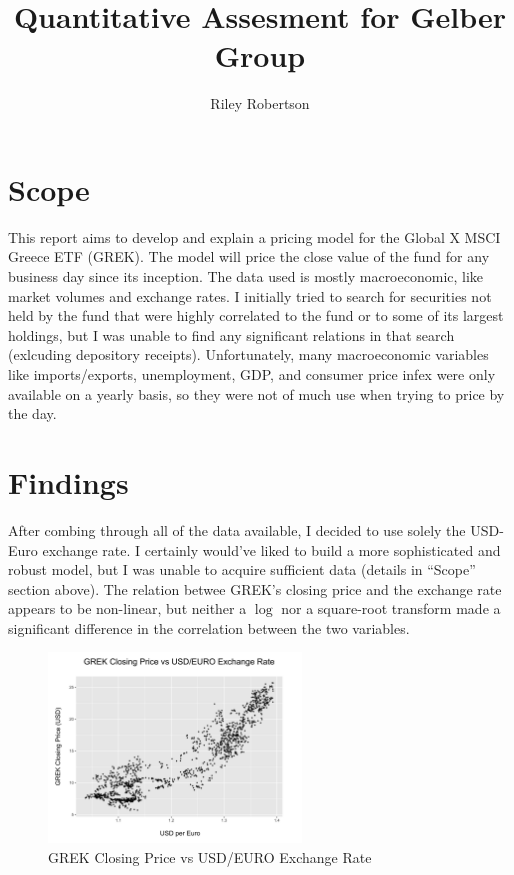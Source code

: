 \documentclass{article}\usepackage[]{graphicx}\usepackage[]{color}
\begin{document}
\title{Quantitative Assesment for Gelber Group}
\author{Riley Robertson}
\maketitle

\section{Scope}
This report aims to develop and explain a pricing model for the Global X MSCI Greece ETF (GREK). The model will price the close value of the fund for any business day since its inception. The data used is mostly macroeconomic, like market volumes and exchange rates. I initially tried to search for securities not held by the fund that were highly correlated to the fund or to some of its largest holdings, but I was unable to find any significant relations in that search (exlcuding depository receipts). Unfortunately, many macroeconomic variables like imports/exports, unemployment, GDP, and consumer price infex were only available on a yearly basis, so they were not of much use when trying to price by the day.

\section{Findings}
After combing through all of the data available, I decided to use solely the USD-Euro exchange rate. I certainly would've liked to build a more sophisticated and robust model, but I was unable to acquire sufficient data (details in ``Scope'' section above). The relation betwee GREK's closing price and the exchange rate appears to be non-linear, but neither a $\log$ nor a square-root transform made a significant difference in the correlation between the two variables.
\begin{figure}[h]
\centering
\includegraphics[width=0.6\textwidth]{figures/close_vs_ex_rate.png}
\caption{GREK Closing Price vs USD/EURO Exchange Rate}
\end{figure}
\end{document}

